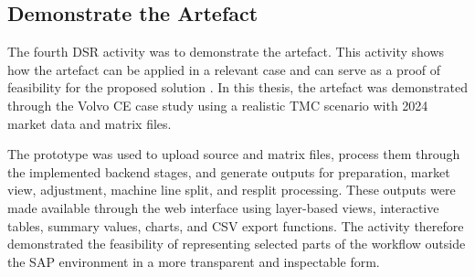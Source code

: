




\subsection{Demonstrate the Artefact}

The fourth DSR activity was to demonstrate the artefact. This activity shows how the artefact can be applied in a relevant case and can serve as a proof of feasibility for the proposed solution \cite{johannesson2021,hevner2004design}. In this thesis, the artefact was demonstrated through the Volvo CE case study using a realistic TMC scenario with 2024 market data and matrix files.

The prototype was used to upload source and matrix files, process them through the implemented backend stages, and generate outputs for preparation, market view, adjustment, machine line split, and resplit processing. These outputs were made available through the web interface using layer-based views, interactive tables, summary values, charts, and CSV export functions. The activity therefore demonstrated the feasibility of representing selected parts of the workflow outside the SAP environment in a more transparent and inspectable form.

